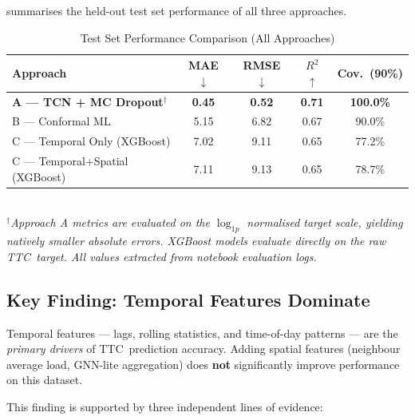 \documentclass[12pt,a4paper]{article}
\newcommand{\ttc}{\textsc{TTC}}
\begin{document}
 summarises the held-out test set performance of all three approaches.

\begin{table}[H]
\centering
\caption{Test Set Performance Comparison (All Approaches)}
\label{tab:results}
\renewcommand{\arraystretch}{1.5}
\begin{tabularx}{\linewidth}{X c c c c}
\toprule
\textbf{Approach} & \textbf{MAE} $\downarrow$ & \textbf{RMSE} $\downarrow$ & $R^2$ $\uparrow$ & \textbf{Cov.\ (90\%)} \\
\midrule
\rowcolor{aplightblue}
\textbf{A — TCN + MC Dropout}$^\dagger$ & \textbf{0.45} & \textbf{0.52} & \textbf{0.71} & \textbf{100.0\%} \\
B — Conformal ML                         & 5.15           & 6.82           & 0.67           & 90.0\% \\
C — Temporal Only (XGBoost)              & 7.02           & 9.11           & 0.65           & 77.2\% \\
C — Temporal+Spatial (XGBoost)           & 7.11           & 9.13           & 0.65           & 78.7\% \\
\bottomrule
\end{tabularx}
\vspace{0.4em}\\
\footnotesize $^\dagger$\textit{Approach A metrics are evaluated on the $\log_{1p}$ normalised target scale, yielding natively smaller absolute errors. XGBoost models evaluate directly on the raw \ttc\ target. All values extracted from notebook evaluation logs.}
\end{table}

\subsection{Key Finding: Temporal Features Dominate}

\begin{insightbox}
Temporal features — lags, rolling statistics, and time-of-day patterns — are the \emph{primary drivers} of \ttc\ prediction accuracy. Adding spatial features (neighbour average load, GNN-lite aggregation) does \textbf{not} significantly improve performance on this dataset.
\end{insightbox}

\vspace{0.4em}
This finding is supported by three independent lines of evidence:
\end{document}
